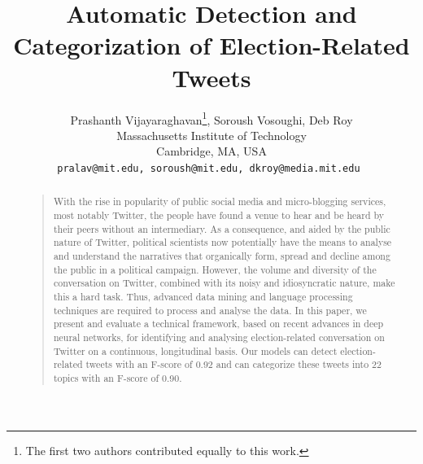 \documentclass[letterpaper]{article}
\begin{document}
%
\title{Automatic Detection and Categorization of Election-Related Tweets}
\author{Prashanth Vijayaraghavan\thanks{The first two authors contributed equally to this work.}, Soroush Vosoughi\footnotemark[1], Deb Roy \\ Massachusetts Institute of Technology \\ Cambridge, MA, USA \\ \tt{pralav@mit.edu, soroush@mit.edu, dkroy@media.mit.edu} }
\maketitle
\begin{abstract}
\begin{quote}
With the rise in popularity of public social media and micro-blogging services, most notably Twitter, the people have found a venue to hear and be heard by their peers without an intermediary. As a consequence, and aided by the public nature of Twitter, political scientists now potentially have the means to analyse and understand the narratives that organically form, spread and decline among the public in a political campaign.
However, the volume and diversity of the conversation on Twitter, combined with its noisy and idiosyncratic nature, make this a hard task. Thus, advanced data mining and language processing techniques are required to process and analyse the data. In this paper, we present and evaluate a technical framework, based on recent advances in deep neural networks, for identifying and analysing election-related conversation on Twitter on a continuous, longitudinal basis. Our models can detect election-related tweets with an F-score of 0.92 and can categorize these tweets into 22 topics with an F-score of 0.90. %
\end{quote}
\end{abstract}
\end{document}
